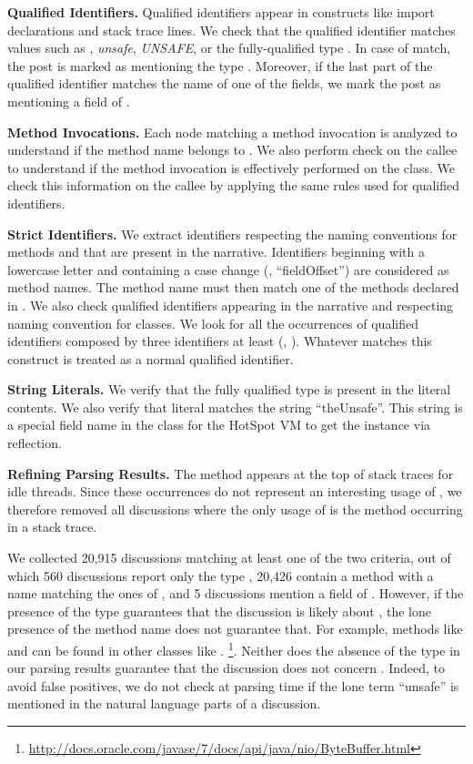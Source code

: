 \textbf{Qualified Identifiers.}
Qualified identifiers appear in constructs like import declarations and stack trace lines.
We check that the qualified identifier matches values such as
\unsafe{}, \emph{unsafe}, \emph{UNSAFE}, or the fully-qualified type \smu{}.
In case of match, the post is marked as mentioning the type \unsafe{}.
Moreover, if the last part of the qualified identifier matches the name of one of the \smu{} fields,
we mark the post as mentioning a field of \unsafe{}.

\textbf{Method Invocations.}
Each node matching a method invocation is analyzed to understand if the method name belongs to \smu{}.
We also perform check on the callee to understand if the method invocation is effectively performed on the \unsafe{} class.
We check this information on the callee by applying the same rules used for qualified identifiers.

\textbf{Strict Identifiers.}
We extract identifiers respecting the \java{} naming conventions for methods and that are present in the narrative.
Identifiers beginning with a lowercase letter and containing a case change
(\eg{}, ``fieldOffset'') are considered as method names.
The method name must then match one of the methods declared in \unsafe{}.
We also check qualified identifiers appearing in the narrative and respecting naming convention for classes.
We look for all the occurrences of qualified identifiers composed by three identifiers at least (\eg{}, \smu{}).
Whatever matches this construct is treated as a normal qualified identifier.

\textbf{String Literals.}
We verify that the fully qualified type \smu{} is present in the literal contents.
We also verify that literal matches the string ``theUnsafe''.
This string is a special field name in the \unsafe{} class for the HotSpot VM to get the instance via reflection.

\textbf{Refining Parsing Results.}
The  method appears at the top of stack traces for idle threads.
Since these occurrences do not represent an interesting usage of \unsafe{},
we therefore removed all discussions where the only usage of \unsafe{} is the  method occurring in a stack trace.

We collected 20,915 discussions matching at least one of the two criteria,
out of which 560 discussions report only the type \unsafe{},
20,426 contain a method with a name matching the ones of \unsafe{},
and 5 discussions mention a field of \unsafe{}.
However, if the presence of the type \unsafe{} guarantees that the discussion is likely about \smu{},
the lone presence of the method name does not guarantee that.
For example, methods like  and  can be found in other classes like .%
\footnote{\url{http://docs.oracle.com/javase/7/docs/api/java/nio/ByteBuffer.html}}.
Neither does the absence of the type in our parsing results guarantee that the discussion does not concern \smu{}.
Indeed, to avoid false positives,
we do not check at parsing time if the lone term ``unsafe'' is mentioned in the natural language parts of a discussion.

